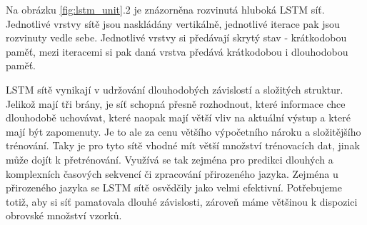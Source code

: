 Na obrázku \ref{fig:lstm_unit}.2 je znázorněna rozvinutá hluboká LSTM síť.
Jednotlivé vrstvy sítě jsou naskládány vertikálně, jednotlivé iterace pak jsou
rozvinuty vedle sebe. Jednotlivé vrstvy si předávají skrytý stav - krátkodobou
paměť, mezi iteracemi si pak daná vrstva předává krátkodobou i dlouhodobou
paměť.

LSTM sítě vynikají v udržování dlouhodobých závislostí a složitých struktur.
Jelikož mají tři brány, je síť schopná přesně rozhodnout, které informace chce
dlouhodobě uchovávat, které naopak mají větší vliv na aktuální výstup a které
mají být zapomenuty. Je to ale za cenu většího výpočetního nároku a
složitějšího trénování. Taky je pro tyto sítě vhodné mít větší množství
trénovacích dat, jinak může dojít k přetrénování. Využívá se tak zejména pro
predikci dlouhých a komplexních časových sekvencí či zpracování přirozeného
jazyka. Zejména u přirozeného jazyka se LSTM sítě osvědčily jako velmi
efektivní. Potřebujeme totiž, aby si síť pamatovala dlouhé závislosti, zároveň
máme většinou k dispozici obrovské množství vzorků.

\endinput